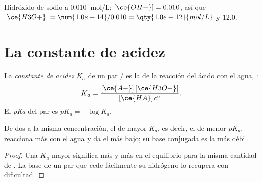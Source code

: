 \begin{example}\label{ex:g12:ka-and-pka:naoh}
Hidróxido de sodio a \qty{0.010}{mol/L}: $[\ce{OH-}] = 0.010$, así que
$[\ce{H3O+}] = \num{1.0e-14}/0.010 = \qty{1.0e-12}{mol/L}$ y  12.0.
\end{example}

\section{La constante de acidez}

\begin{definition}\label{def:g12:ka-and-pka:ka}
La \emph{constante de acidez} $K_a$ de un par
/ es la  de la reacción del ácido
con el agua, :
\[
  K_a = \frac{[\ce{A-}]\,[\ce{H3O+}]}{[\ce{HA}]\,c^\circ} .
\]
El \emph{pKa} del par es
$pK_a = -\log K_a$.
\end{definition}

\begin{proposition}\label{prop:g12:ka-and-pka:compare}
De dos  a la misma concentración, el de mayor $K_a$, es
decir, el de menor $pK_a$, reacciona más con el agua y da el  más
bajo; su base conjugada es la más débil.
\end{proposition}

\begin{proof}
Una $K_a$ mayor significa más  y más  en el equilibrio
para la misma cantidad de . La base  de un par que cede
fácilmente su  hidrógeno lo recupera con dificultad.
\end{proof}

